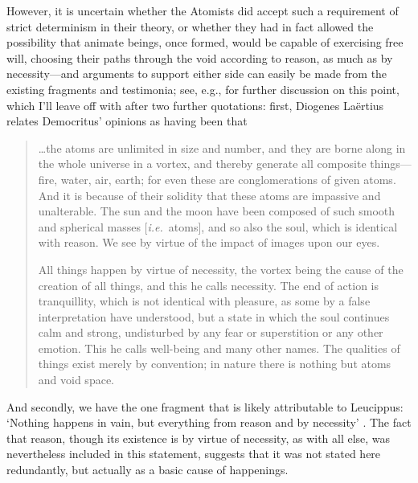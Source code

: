 However, it is uncertain whether the Atomists did accept such a requirement of strict determinism in their theory, or whether they had in fact allowed the possibility that animate beings, once formed, would be capable of exercising free will, choosing their paths through the void according to reason, as much as by necessity---and arguments to support either side can easily be made from the existing fragments and testimonia; see, e.g., \cite{Taylor1999} for further discussion on this point, which I'll leave off with after two further quotations: first, Diogenes La\"{e}rtius relates Democritus' opinions as having been that \cite{Diogenes1931}
\begin{quotation}
\ldots the atoms are unlimited in size and number, and they are borne along in the whole universe in a vortex, and thereby generate all composite things---fire, water, air, earth; for even these are conglomerations of given atoms. And it is because of their solidity that these atoms are impassive and unalterable. The sun and the moon have been composed of such smooth and spherical masses [\textit{i.e.}~atoms], and so also the soul, which is identical with reason. We see by virtue of the impact of images upon our eyes.

All things happen by virtue of necessity, the vortex being the cause of the creation of all things, and this he calls necessity. The end of action is tranquillity, which is not identical with pleasure, as some by a false interpretation have understood, but a state in which the soul continues calm and strong, undisturbed by any fear or superstition or any other emotion. This he calls well-being and many other names. The qualities of things exist merely by convention; in nature there is nothing but atoms and void space.
\end{quotation}
And secondly, we have the one fragment that is likely attributable to Leucippus: `Nothing happens in vain, but everything from reason and by necessity' \cite{Taylor1999}. The fact that reason, though its existence is by virtue of necessity, as with all else, was nevertheless included in this statement, suggests that it was not stated here redundantly, but actually as a basic cause of happenings.

